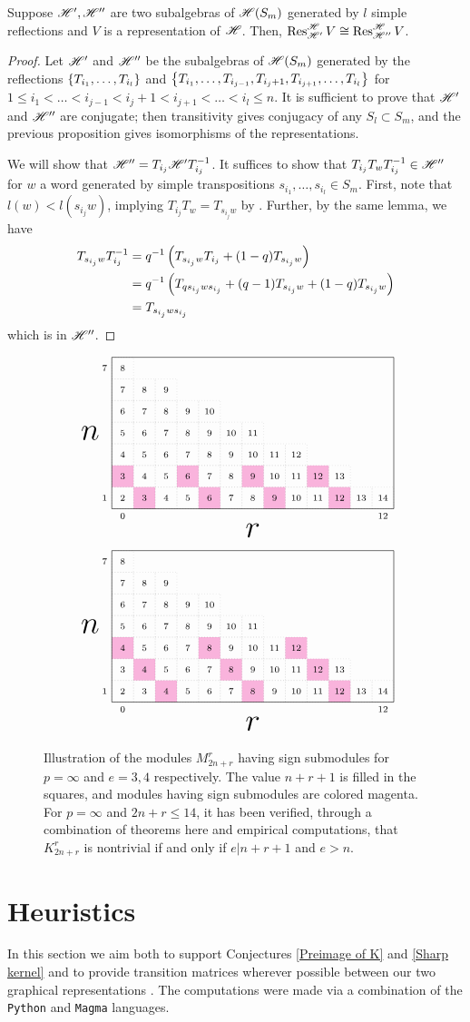 \documentclass{amsart}
\begin{document}
\begin{corollary}
  Suppose $\mathscr{H}',\mathscr{H}''$ are two subalgebras of $\mathscr{H}(S_m)$ generated by $l$ simple reflections and $V$ is a representation of $\mathscr{H}$.
  Then, $\operatorname{Res}_{\mathscr{H}'}^{\mathscr{H}} V \cong \operatorname{Res}_{\mathscr{H}''}^{\mathscr{H}} V$.
\end{corollary}
\begin{proof}
  Let $\mathscr{H}'$ and $\mathscr{H}''$ be the subalgebras of $\mathscr{H}(S_m)$ generated by the reflections $\left\{ T_{i_1},\dots,T_{i_l} \right\}$ and $\left\{ T_{i_1},\dots,T_{i_{j-1}},T_{i_j + 1},T_{i_{j+1}},\dots,T_{i_l} \right\}$ for $1 \leq i_1 < \dots < i_{j-1} < i_j + 1 < i_{j+1} < \dots < i_l \leq n$.
  It is sufficient to prove that $\mathscr{H}'$ and $\mathscr{H}''$ are conjugate;
  then transitivity gives conjugacy of any $S_l \subset S_m$, and the previous proposition gives isomorphisms of the representations.
 
  We will show that $\mathscr{H}'' = T_{i_j}\mathscr{H}'T_{i_j}^{-1}$.
  It suffices to show that $T_{i_j}T_wT_{i_j}^{-1} \in \mathscr{H}''$ for $w$ a word generated by simple transpositions $s_{i_1},\dots,s_{i_{l}} \in S_m$.
  First, note that $l(w) < l(s_{i_j}w)$, implying $T_{i_j}T_w = T_{s_{i_j}w}$ by \cite[Leb.~1.12]{Mathas-book}.
  Further, by the same lemma, we have
  \begin{align*}
    T_{s_{i_j}w}T_{i_j}^{-1} 
    &= q^{-1}\left( T_{s_{i_j}w}T_{i_j} + (1-q)T_{s_{i_j}w} \right)\\
    &= q^{-1}\left( T_{qs_{i_j}ws_{i_j}} + (q-1)T_{s_{i_j}w} + (1-q)T_{s_{i_j}w} \right)\\
    &= T_{s_{i_j}ws_{i_j}}
  \end{align*}
  which is in $\mathscr{H}''$.
\end{proof}

\begin{figure}
  \[
    \ENRGrid{13/7}{2/1,5/1,8/1,11/1,1/2,4/2,7/2,10/2}
  \]\[
    \ENRGrid{13/7}{3/1,7/1,11/1,2/2,6/2,10/2,1/3,5/3,9/3}
  \]
  \caption{
    Illustration of the modules $M_{2n + r}^r$ having sign submodules for $p = \infty$ and $e = 3,4$ respectively.
    The value $n + r + 1$ is filled in the squares, and modules having sign submodules are colored magenta.
    For $p = \infty$ and $2n + r \leq 14$, it has been verified, through a combination of theorems here and empirical computations, that $K_{2n + r}^r$ is nontrivial if and only if $e | n+r+1$ and $e > n$.
  }\label{Empirical Kernel}
\end{figure}


\section{Heuristics}\label{Empirics Section}
In this section we aim both to support Conjectures \ref{Preimage of K} and \ref{Sharp kernel} and to provide transition matrices wherever possible between our two graphical representations \cite{Github}.
The computations were made via a combination of the \texttt{Python} \cite{Python} and \texttt{Magma} \cite{Magma} languages.
\end{document}
